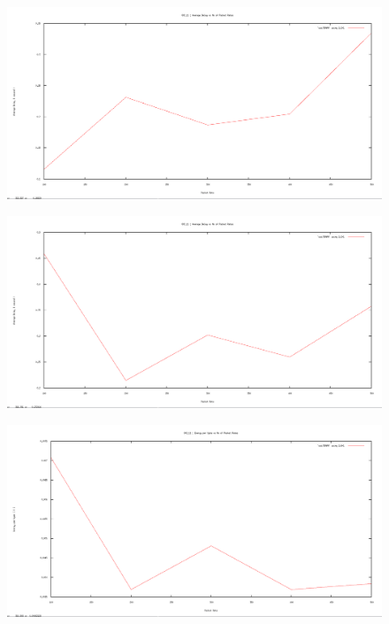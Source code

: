 \documentclass[12pt]{article}
\begin{document}
\begin{figure}[H]
	\centering
	\includegraphics[scale=	0.26]{image/bpics/bm_averagedelay_vs_packetrates.png}
\end{figure}

\begin{figure}[H]
	\centering
	\includegraphics[scale=	0.26]{image/apics/am_averagedeliveryratio_vs_packetrates.png}
\end{figure}

\begin{figure}[H]
	\centering
	\includegraphics[scale=	0.26]{image/bpics/bm_Energyperbyte_vs_packrates.png}
\end{figure}
\end{document}
